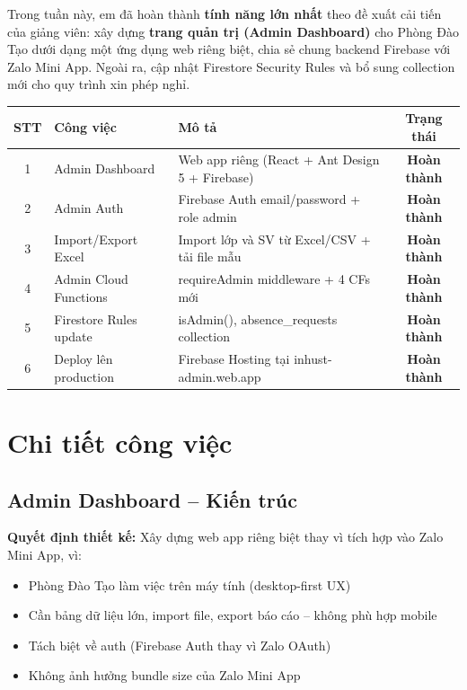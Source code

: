 \documentclass{article}
\begin{document}
Trong tuần này, em đã hoàn thành \textbf{tính năng lớn nhất} theo đề xuất cải tiến của giảng viên: xây dựng \textbf{trang quản trị (Admin Dashboard)} cho Phòng Đào Tạo dưới dạng một ứng dụng web riêng biệt, chia sẻ chung backend Firebase với Zalo Mini App. Ngoài ra, cập nhật Firestore Security Rules và bổ sung collection mới cho quy trình xin phép nghỉ.

\begin{center}
\begin{tabularx}{\textwidth}{@{}c l X c@{}}
\toprule
\textbf{STT} & \textbf{Công việc} & \textbf{Mô tả} & \textbf{Trạng thái} \\
\midrule
1 & Admin Dashboard & Web app riêng (React + Ant Design 5 + Firebase) & \textcolor{statusgreen}{\textbf{Hoàn thành}} \\
2 & Admin Auth & Firebase Auth email/password + role admin & \textcolor{statusgreen}{\textbf{Hoàn thành}} \\
3 & Import/Export Excel & Import lớp và SV từ Excel/CSV + tải file mẫu & \textcolor{statusgreen}{\textbf{Hoàn thành}} \\
4 & Admin Cloud Functions & requireAdmin middleware + 4 CFs mới & \textcolor{statusgreen}{\textbf{Hoàn thành}} \\
5 & Firestore Rules update & isAdmin(), absence\_requests collection & \textcolor{statusgreen}{\textbf{Hoàn thành}} \\
6 & Deploy lên production & Firebase Hosting tại inhust-admin.web.app & \textcolor{statusgreen}{\textbf{Hoàn thành}} \\
\bottomrule
\end{tabularx}
\end{center}

\section{Chi tiết công việc}

\subsection{Admin Dashboard -- Kiến trúc}

\textbf{Quyết định thiết kế:} Xây dựng web app riêng biệt thay vì tích hợp vào Zalo Mini App, vì:
\begin{itemize}[leftmargin=1.5em]
  \item Phòng Đào Tạo làm việc trên máy tính (desktop-first UX)
  \item Cần bảng dữ liệu lớn, import file, export báo cáo -- không phù hợp mobile
  \item Tách biệt về auth (Firebase Auth thay vì Zalo OAuth)
  \item Không ảnh hưởng bundle size của Zalo Mini App
\end{itemize}
\end{document}
